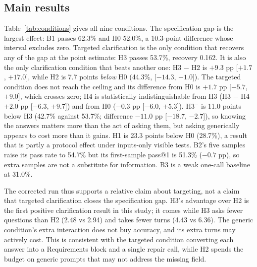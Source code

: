 \documentclass{article}
\begin{document}
\subsection{Main results}

Table~\ref{tab:conditions} gives all nine conditions. The specification gap is the largest
effect: B1 passes 62.3\% and H0 52.0\%, a 10.3-point difference whose interval excludes zero.
Targeted clarification is the only condition that recovers any of the gap at the point
estimate: H3 passes 53.7\%, recovery 0.162. It is also the only clarification condition that
beats another one: H3 $-$ H2 is $+9.3$ pp [$+1.7$, $+17.0$], while H2 is 7.7 points
\emph{below} H0 (44.3\%, [$-14.3$, $-1.0$]). The targeted condition does not reach the
ceiling and its difference from H0 is $+1.7$ pp [$-5.7$, $+9.0$], which crosses zero; H4 is
statistically indistinguishable from H3 (H3 $-$ H4 $+2.0$ pp [$-6.3$, $+9.7$]) and from H0
($-0.3$ pp [$-6.0$, $+5.3$]). H3$^-$ is 11.0 points below H3 (42.7\% against 53.7\%; difference $-11.0$ pp [$-18.7$, $-2.7$]),
so knowing the answers matters more than the act of asking them, but asking generically
appears to cost more than it gains. H1 is 23.3 points below H0 (28.7\%), a result that is
partly a protocol effect under inputs-only visible tests. B2's five samples raise its pass
rate to 54.7\% but its first-sample pass@1 is 51.3\% ($-0.7$ pp), so extra samples are not a
substitute for information. B3 is a weak one-call baseline at 31.0\%.

The corrected run thus supports a relative claim about targeting, not a claim that targeted
clarification closes the specification gap. H3's advantage over H2 is the first positive
clarification result in this study; it comes while H3 asks fewer questions than H2 (2.48 vs
2.94) and takes fewer turns (4.43 vs 6.36). The generic condition's extra interaction does not
buy accuracy, and its extra turns may actively cost. This is consistent with the targeted
condition converting each answer into a Requirements block and a single repair call, while H2
spends the budget on generic prompts that may not address the missing field.
\end{document}
